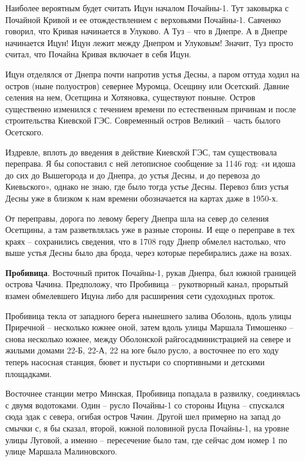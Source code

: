 Наиболее вероятным будет считать Ицун началом Почайны-1. Тут заковырка с Почайной Кривой и ее отождествлением с верховьями Почайны-1. Савченко говорил, что Кривая начинается в Улуково. А Туз – что в Днепре. А в Днепре начинается Ицун! Ицун лежит между Днепром и Улуковым! Значит, Туз просто считал, что Почайна Кривая включает в себя Ицун.

Ицун отделялся от Днепра почти напротив устья Десны, а паром оттуда ходил на остров (ныне полуостров) севернее Муромца, Осещину или Осетский. Давние селения на нем, Осетщина и Хотяновка, существуют поныне. Остров существенно изменился с течением времени по естественным причинам и после строительства Киевской ГЭС. Современный остров Великий – часть былого Осетского.

Издревле, вплоть до введения в действие Киевской ГЭС, там существовала переправа. Я бы сопоставил с ней летописное сообщение за 1146 год: «и идоша до сих до Вышегорода и до Днепра, до устья Десны, и до перевоза до Киевьского», однако не знаю, где было тогда устье Десны. Перевоз близ устья Десны уже в близком к нам времени обозначается на картах даже в 1950-х.

От переправы, дорога по левому берегу Днепра шла на север до селения Осетщины, а там разветвлялась уже в разные стороны. И еще о переправе в тех краях – сохранились сведения, что в 1708 году Днепр обмелел настолько, что выше устья Десны было два брода, через которые перебирались даже на возах.

\textbf{Пробивица}. Восточный приток Почайны-1, рукав Днепра, был южной границей острова Чачина. Предположу, что Пробивица – рукотворный канал, прорытый взамен обмелевшего Ицуна либо для расширения сети судоходных проток.

Пробивица текла от западного берега нынешнего залива Оболонь, вдоль улицы Приречной – несколько южнее оной, затем вдоль улицы Маршала Тимошенко – снова несколько южнее, между Оболонской райгосадминистрацией на севере и жилыми домами 22-Б, 22-А, 22 на юге было русло, а восточнее по его ходу теперь насосная станция, бювет и пустыри со спортивными и детскими площадками.

Восточнее станции метро Минская, Пробивица попадала в развилку, соединялась с двумя водотоками. Один – русло Почайны-1 со стороны Ицуна – спускался сюда эдак с севера, огибая остров Чачин. Другой шел примерно на запад до смычки с, я бы сказал, второй, южной половиной русла Почайны-1, на уровне улицы Луговой, а именно – пересечение было там, где сейчас дом номер 1 по улице Маршала Малиновского.

